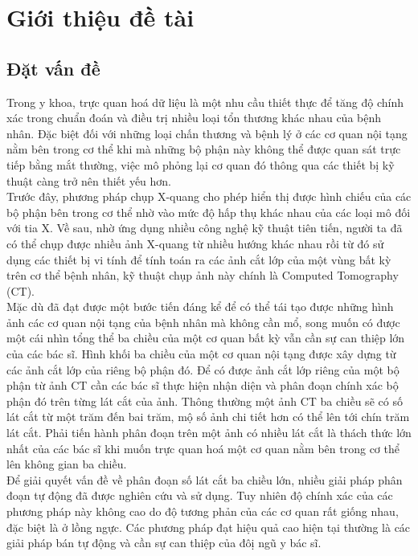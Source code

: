 \chapter{Giới thiệu đề tài}
\section{Đặt vấn đề}
Trong y khoa, trực quan hoá dữ liệu là một nhu cầu thiết thực để tăng độ chính xác trong chuẩn đoán và điều trị nhiều loại tổn thương khác nhau của bệnh nhân. Đặc biệt đối với những loại chấn thương và bệnh lý ở các cơ quan nội tạng nằm bên trong cơ thể khi mà những bộ phận này không thể được quan sát trực tiếp bằng mắt thường, việc mô phỏng lại cơ quan đó thông qua các thiết bị kỹ thuật càng trở nên thiết yếu hơn. \\
Trước đây, phương pháp chụp X-quang cho phép hiển thị được hình chiếu của các bộ phận bên trong cơ thể nhờ vào mức độ hấp thụ khác nhau của các loại mô đối với tia X. Về sau, nhờ ứng dụng nhiều công nghệ kỹ thuật tiên tiến, người ta đã có thể chụp được nhiều ảnh X-quang từ nhiều hướng khác nhau rồi từ đó sử dụng các thiết bị vi tính để tính toán ra các ảnh cắt lớp của một vùng bất kỳ trên cơ thể bệnh nhân, kỹ thuật chụp ảnh này chính là Computed Tomography (CT).\\
Mặc dù đã đạt được một bước tiến đáng kể để có thể tái tạo được những hình ảnh các cơ quan nội tạng của bệnh nhân mà không cần mổ, song muốn có được một cái nhìn tổng thể ba chiều của một cơ quan bất kỳ vẫn cần sự can thiệp lớn của các bác sĩ. Hình khối ba chiều của một cơ quan nội tạng được xây dựng từ các ảnh cắt lớp của riêng bộ phận đó. Để có được ảnh cắt lớp riêng của một bộ phận từ ảnh CT cần các bác sĩ thực hiện nhận diện và phân đoạn chính xác bộ phận đó trên từng lát cắt của ảnh. Thông thường một ảnh CT ba chiều sẽ có số lát cắt từ một trăm đến bai trăm, mộ số ảnh chi tiết hơn có thể lên tới chín trăm lát cắt. Phải tiến hành phân đoạn trên một ảnh có nhiều lát cắt là thách thức lớn nhất của các bác sĩ khi muốn trực quan hoá một cơ quan nằm bên trong cơ thể lên không gian ba chiều.\\
Để giải quyết vấn đề về phân đoạn số lát cắt ba chiều lớn, nhiều giải pháp phân đoạn tự động đã được nghiên cứu và sử dụng. Tuy nhiên độ chính xác của các phương pháp này không cao do độ tương phản của các cơ quan rất giống nhau, đặc biệt là ở lồng ngực. Các phương pháp đạt hiệu quả cao hiện tại thường là các giải pháp bán tự động và cần sự can thiệp của đôị ngũ y bác sĩ.
